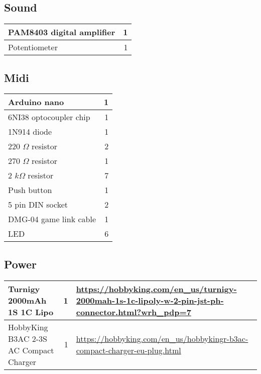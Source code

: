 \documentclass{article}
\begin{document}
\subsection{Sound}
\begin{tabular}{p{5cm} r}

        \hline PAM8403 digital amplifier & 1 \\
        \hline Potentiometer & 1 \\
        \hline 
        
\end{tabular}

\subsection{Midi}

\begin{tabular}{p{5cm} r}

        \hline Arduino nano & 1 \\
        \hline 6NI38 optocoupler chip & 1 \\
        \hline 1N914 diode & 1 \\
        \hline 220 $\Omega$ resistor & 2 \\
        \hline 270 $\Omega$ resistor & 1 \\
        \hline 2 $k\Omega$ resistor & 7 \\
        \hline Push button & 1 \\
        \hline 5 pin DIN socket & 2 \\
        \hline DMG-04 game link cable & 1 \\
        \hline LED & 6 \\
        \hline

\end{tabular}

\subsection{Power}

\begin{tabular}{p{5cm} r p{8cm}}

        \hline Turnigy 2000mAh 1S 1C Lipo & 1 & \url{https://hobbyking.com/en_us/turnigy-2000mah-1s-1c-lipoly-w-2-pin-jst-ph-connector.html?wrh_pdp=7} \\
        \hline HobbyKing B3AC 2-3S AC Compact Charger & 1 & \url{https://hobbyking.com/en_us/hobbykingr-b3ac-compact-charger-eu-plug.html}
        \hline

\end{tabular}
\end{document}
